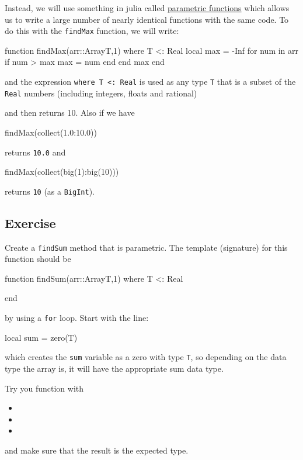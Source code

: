 Instead, we will use something in julia called
\href{https://docs.julialang.org/en/latest/manual/methods/\#Parametric-Methods-1}{parametric
functions} which allows us to write a large number of nearly identical
functions with the same code. To do this with the \texttt{findMax}
function, we will write:

\begin{jlblock}[adf]
function findMax(arr::Array{T,1}) where T <: Real
  local max = -Inf
  for num in arr
    if num > max
      max = num
    end
  end
  max
end
\end{jlblock}
%
and the expression \texttt{where\ T\ \textless{}:\ Real} is used as any
type \texttt{T} that is a subset of the \texttt{Real} numbers (including
integers, floats and rational)

and then  returns 10. Also if we have

\begin{jlblock}[adf]
findMax(collect(1.0:10.0))
\end{jlblock}

returns \texttt{10.0} and

\begin{jlverbatim}[adf]
findMax(collect(big(1):big(10)))
\end{jlverbatim}

returns \texttt{10} (as a \texttt{BigInt}).

\subsection{Exercise}

Create a \verb!findSum! method that is parametric.  The template (signature) for this function should be
\begin{jlverbatim}[adf]
function findSum(arr::Array{T,1}) where T <: Real

end
\end{jlverbatim}
by using a \verb!for! loop.  Start with the line:
\begin{jlverbatim}
local sum = zero(T)
\end{jlverbatim}
%
which creates the \texttt{sum} variable as a zero with type \verb!T!, so depending on the data type the array is, it will have the appropriate sum data type.  

Try you function with 
\begin{itemize}
\item {}
\item {}
\item {}
\end{itemize}
and make sure that the result is the expected type. 
